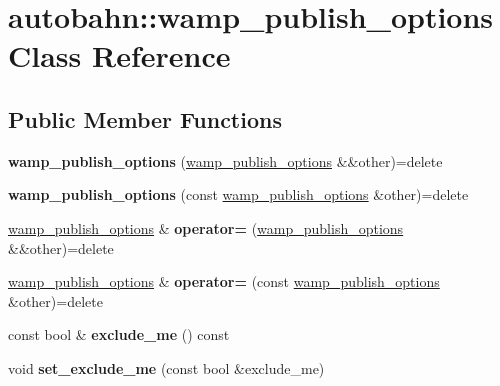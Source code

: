 \hypertarget{classautobahn_1_1wamp__publish__options}{}\section{autobahn\+:\+:wamp\+\_\+publish\+\_\+options Class Reference}
\label{classautobahn_1_1wamp__publish__options}
\subsection*{Public Member Functions}
\begin{DoxyCompactItemize}
\item 
{\bfseries wamp\+\_\+publish\+\_\+options} (\hyperlink{classautobahn_1_1wamp__publish__options}{wamp\+\_\+publish\+\_\+options} \&\&other)=delete\hypertarget{classautobahn_1_1wamp__publish__options_afc0f11a40515cb77c1b423d5ec95ab18}{}\label{classautobahn_1_1wamp__publish__options_afc0f11a40515cb77c1b423d5ec95ab18}

\item 
{\bfseries wamp\+\_\+publish\+\_\+options} (const \hyperlink{classautobahn_1_1wamp__publish__options}{wamp\+\_\+publish\+\_\+options} \&other)=delete\hypertarget{classautobahn_1_1wamp__publish__options_a987eee20209a49ecf3480e9770c47931}{}\label{classautobahn_1_1wamp__publish__options_a987eee20209a49ecf3480e9770c47931}

\item 
\hyperlink{classautobahn_1_1wamp__publish__options}{wamp\+\_\+publish\+\_\+options} \& {\bfseries operator=} (\hyperlink{classautobahn_1_1wamp__publish__options}{wamp\+\_\+publish\+\_\+options} \&\&other)=delete\hypertarget{classautobahn_1_1wamp__publish__options_af2b4b7ff246e5c761ab5f7b2f84173ca}{}\label{classautobahn_1_1wamp__publish__options_af2b4b7ff246e5c761ab5f7b2f84173ca}

\item 
\hyperlink{classautobahn_1_1wamp__publish__options}{wamp\+\_\+publish\+\_\+options} \& {\bfseries operator=} (const \hyperlink{classautobahn_1_1wamp__publish__options}{wamp\+\_\+publish\+\_\+options} \&other)=delete\hypertarget{classautobahn_1_1wamp__publish__options_ac9614a06cdd6dc90e3cb24a3a5833b8f}{}\label{classautobahn_1_1wamp__publish__options_ac9614a06cdd6dc90e3cb24a3a5833b8f}

\item 
const bool \& {\bfseries exclude\+\_\+me} () const \hypertarget{classautobahn_1_1wamp__publish__options_a7fb06211e7b0a2bab78742bb55b78ddb}{}\label{classautobahn_1_1wamp__publish__options_a7fb06211e7b0a2bab78742bb55b78ddb}

\item 
void {\bfseries set\+\_\+exclude\+\_\+me} (const bool \&exclude\+\_\+me)\hypertarget{classautobahn_1_1wamp__publish__options_aad04c3ddf7b784ca857d70db30ec7652}{}\label{classautobahn_1_1wamp__publish__options_aad04c3ddf7b784ca857d70db30ec7652}

\end{DoxyCompactItemize}



